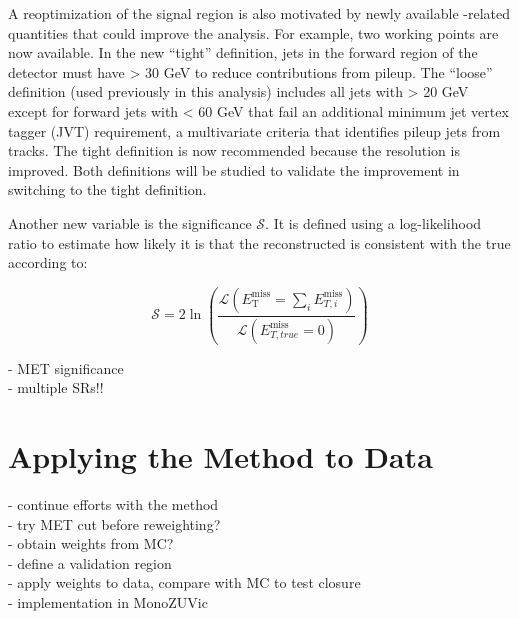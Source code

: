 A reoptimization of the signal region is also motivated by newly available \etmiss-related quantities that could improve the \monoZ analysis. For example, two \etmiss working points are now available. In the new ``tight'' \etmiss definition, jets in the forward region of the detector must have \pt > 30 GeV to reduce contributions from pileup. The ``loose'' definition (used previously in this analysis) includes all jets with \pt > 20 GeV except for forward jets with \pt < 60 GeV that fail an additional minimum jet vertex tagger (JVT) requirement, a multivariate criteria that identifies pileup jets from tracks. The tight definition is now recommended because the \etmiss resolution is improved. Both definitions will be studied to validate the improvement in switching to the tight definition.

Another new variable is the \etmiss significance $\mathcal{S}$. It is defined using a log-likelihood ratio to estimate how likely it is that the reconstructed \etmiss is consistent with the true \etmiss according to:

\begin{equation}
\mathcal{S} = 2 \ln \left( \frac{\mathcal{L}(E_\text{T}^\text{miss} = \sum_i E_{T,i}^\text{miss})}{\mathcal{L}(E_{T,true}^\text{miss} = 0)} \right)
\end{equation}



- MET significance \\ 

- multiple SRs!! \\


\section{Applying the \gjets Method to Data}

- continue efforts with the \gjets method\\
- try MET cut before reweighting?\\
- obtain weights from MC?\\
- define a validation region\\
- apply weights to data, compare with MC to test closure\\
- implementation in MonoZUVic\\

